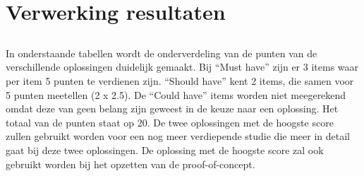 
\chapter{Verwerking resultaten}
\label{ch:Verwerking resultaten}



\section{}
\label{sec:Resultaten requirements}





















\section{}
\label{sec:Resultatenanalyse}

\subsection{}
\label{subsec:Resultaten requirements}

In onderstaande tabellen wordt de onderverdeling van de punten van de verschillende oplossingen duidelijk gemaakt. Bij “Must have” zijn er 3 items waar per item 5 punten te verdienen zijn. “Should have” kent 2 items, die samen voor 5 punten meetellen (2 x 2.5). De “Could have” items worden niet meegerekend omdat deze van geen belang zijn geweest in de keuze naar een oplossing. Het totaal van de punten staat op 20. De twee oplossingen met de hoogste score zullen gebruikt worden voor een nog meer verdiepende studie die meer in detail gaat bij deze twee oplossingen. De oplossing met de hoogste score zal ook gebruikt worden bij het opzetten van de proof-of-concept.

